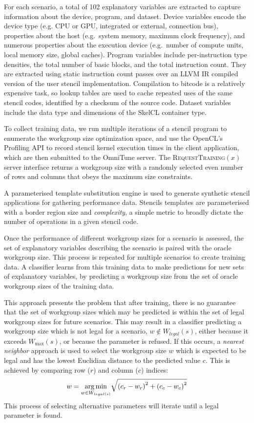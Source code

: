 \documentclass[nonatbib,preprint,nocopyrightspace,9pt]{sigplanconf}
\begin{document}
For each scenario, a total of 102 explanatory variables are extracted
to capture information about the device, program, and dataset. Device
variables encode the device type (e.g. CPU or GPU, integrated or
external, connection bus), properties about the host (e.g.\ system
memory, maximum clock frequency), and numerous properties about the
execution device (e.g.\ number of compute units, local memory size,
global caches). Program variables include per-instruction type
densities, the total number of basic blocks, and the total instruction
count. They are extracted using static instruction count passes over
an LLVM IR compiled version of the user stencil
implementation. Compilation to bitcode is a relatively expensive task,
so lookup tables are used to cache repeated uses of the same stencil
codes, identified by a checksum of the source code. Dataset variables
include the data type and dimensions of the SkelCL container type.

To collect training data, we run multiple iterations of a stencil
program to enumerate the workgroup size optimization space, and use
the OpenCL's Profiling API to record stencil kernel execution times in
the client application, which are then submitted to the OmniTune
server. The \textsc{RequestTraining}$(x)$ server interface returns a
workgroup size with a randomly selected even number of rows and
columns that obeys the maximum size constraints.

A parameterised template substitution engine is used to generate
synthetic stencil applications for gathering performance
data. Stencils templates are parameterised with a border region size
and \emph{complexity}, a simple metric to broadly dictate the number
of operations in a given stencil code.

Once the performance of different workgroup sizes for a scenario is
assessed, the set of explanatory variables describing the scenario is
paired with the oracle workgroup size. This process is repeated for
multiple scenarios to create training data. A classifier learns from
this training data to make predictions for new sets of explanatory
variables, by predicting a workgroup size from the set of oracle
workgroup sizes of the training data.

This approach presents the problem that after training, there is no
guarantee that the set of workgroup sizes which may be predicted is
within the set of legal workgroup sizes for future scenarios. This may
result in a classifier predicting a workgroup size which is not legal
for a scenario, $w \not\in W_{legal}(s)$, either because it exceeds
$W_{\max}(s)$, or because the parameter is refused. If this occurs, a
\emph{nearest neighbor} approach is used to select the workgroup size
$w$ which is expected to be legal and has the lowest Euclidian
distance to the predicted value $c$. This is achieved by comparing row
($r$) and column ($c$) indices:
%
\begin{equation}
  w = \underset{w \in W_{legal(s)}}{\operatorname*{arg\,min}} \sqrt{\left(c_r - w_r\right)^2 + \left(c_c - w_c\right)^2}
\end{equation}
%
This process of selecting alternative parameters will iterate until a
legal parameter is found.
\end{document}
